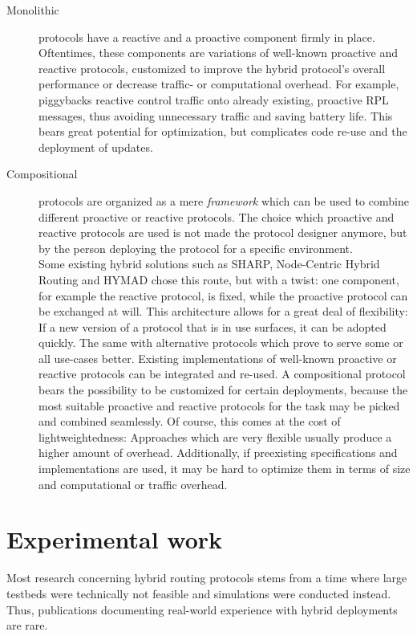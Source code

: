\documentclass[a4paper,10pt]{scrartcl}
\begin{document}
\begin{description}
\item[Monolithic] protocols have a reactive and a proactive component firmly in place. Oftentimes, these components are variations of well-known proactive and reactive protocols, customized to improve the hybrid protocol's overall performance or decrease traffic- or computational overhead. For example, \cite{baccelli_p2p_rpl} piggybacks reactive control traffic onto already existing, proactive RPL messages, thus avoiding unnecessary traffic and saving battery life. %
This bears great potential for optimization, but complicates code re-use and the deployment of updates.\\
\item[Compositional] protocols are organized as a mere \emph{framework} which can be used to combine different proactive or reactive protocols. 
The choice which proactive and reactive protocols are used is not made the protocol designer anymore, but by the person deploying the protocol for a specific environment.\\
Some existing hybrid solutions such as SHARP, Node-Centric Hybrid Routing and HYMAD chose this route, but with a twist: one component, for example the reactive protocol, is fixed, while the proactive protocol can be exchanged at will. This architecture allows for a great deal of flexibility: If a new version of a protocol that is in use surfaces, it can be adopted quickly. The same with alternative protocols which prove to serve some or all use-cases better. Existing implementations of well-known proactive or reactive protocols can be integrated and re-used.
A compositional protocol bears the possibility to be customized for certain deployments, because the most suitable proactive and reactive protocols for the task may be picked and combined seamlessly.
Of course, this comes at the cost of lightweightedness: Approaches which are very flexible usually produce a higher amount of overhead. Additionally, if preexisting specifications and implementations are used, it may be hard to optimize them in terms of size and computational or traffic overhead.
\end{description}


\newpage

\section{Experimental work}
\label{sec:experiments}
Most research concerning hybrid routing protocols stems from a time where large testbeds were technically not feasible and simulations were conducted instead. 
Thus, publications documenting real-world experience with hybrid deployments are rare.\\
\end{document}
